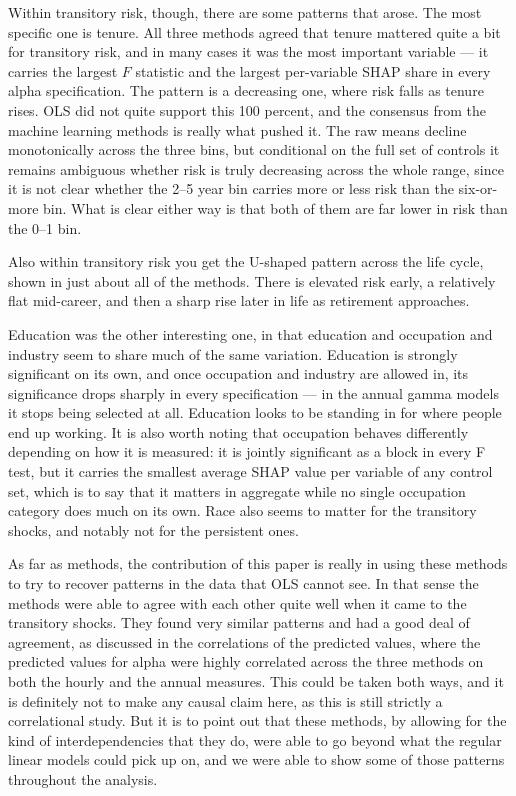 \documentclass[12pt]{article}
\begin{document}
\begin{onehalfspace}
Within transitory risk, though, there are some patterns that arose. The most specific one is tenure. All three methods agreed that tenure mattered quite a bit for transitory risk, and in many cases it was the most important variable --- it carries the largest $F$ statistic and the largest per-variable SHAP share in every alpha specification. The pattern is a decreasing one, where risk falls as tenure rises. OLS did not quite support this 100 percent, and the consensus from the machine learning methods is really what pushed it. The raw means decline monotonically across the three bins, but conditional on the full set of controls it remains ambiguous whether risk is truly decreasing across the whole range, since it is not clear whether the 2--5 year bin carries more or less risk than the six-or-more bin. What is clear either way is that both of them are far lower in risk than the 0--1 bin.

Also within transitory risk you get the U-shaped pattern across the life cycle, shown in just about all of the methods. There is elevated risk early, a relatively flat mid-career, and then a sharp rise later in life as retirement approaches.

Education was the other interesting one, in that education and occupation and industry seem to share much of the same variation. Education is strongly significant on its own, and once occupation and industry are allowed in, its significance drops sharply in every specification --- in the annual gamma models it stops being selected at all. Education looks to be standing in for where people end up working. It is also worth noting that occupation behaves differently depending on how it is measured: it is jointly significant as a block in every F test, but it carries the smallest average SHAP value per variable of any control set, which is to say that it matters in aggregate while no single occupation category does much on its own. Race also seems to matter for the transitory shocks, and notably not for the persistent ones.

As far as methods, the contribution of this paper is really in using these methods to try to recover patterns in the data that OLS cannot see. In that sense the methods were able to agree with each other quite well when it came to the transitory shocks. They found very similar patterns and had a good deal of agreement, as discussed in the correlations of the predicted values, where the predicted values for alpha were highly correlated across the three methods on both the hourly and the annual measures. This could be taken both ways, and it is definitely not to make any causal claim here, as this is still strictly a correlational study. But it is to point out that these methods, by allowing for the kind of interdependencies that they do, were able to go beyond what the regular linear models could pick up on, and we were able to show some of those patterns throughout the analysis.


\end{onehalfspace}
\end{document}
